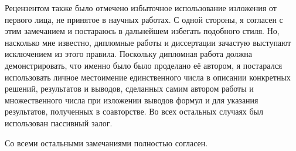 \documentclass{trlnotes}
\begin{document}
Рецензентом также было отмечено избыточное использование изложения от первого лица, не принятое в научных работах.
С одной стороны, я согласен с этим замечанием и постараюсь в дальнейшем избегать подобного стиля. 
Но, насколько мне известно, дипломные работы и диссертации зачастую выступают исключением из этого правила.
Поскольку дипломная работа должна демонстрировать, что именно было было проделано её автором, 
я постарался использовать личное местоимение единственного числа в описании конкретных решений, 
результатов и выводов, сделанных самим автором работы и множественного числа при
изложении выводов формул и для указания результатов, полученных в соавторстве. 
Во всех остальных случаях был использован пассивный залог.

Со всеми остальными замечаниями полностью согласен.
\end{document}
